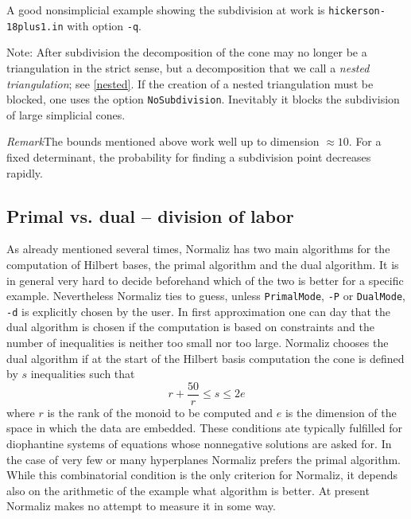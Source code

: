 \documentclass[12pt,a4paper]{scrartcl}
\theoremstyle{definition}
\begin{document}
{	A good nonsimplicial example showing the subdivision at work is \verb|hickerson-18plus1.in| with option \verb|-q|.
	
	Note: After subdivision the decomposition of the cone may no longer be a triangulation in the strict sense, but a decomposition that we call a \emph{nested triangulation}; see \ref{nested}. If the creation of a nested triangulation must be blocked, one uses the option \verb|NoSubdivision|. Inevitably it blocks the subdivision of large simplicial cones.
	
	\emph{Remark}\enspace The bounds mentioned above work well up to dimension $\approx 10$. For a fixed determinant, the probability for finding a subdivision point decreases rapidly.
	
	\subsection{Primal vs. dual -- division of labor}\label{div_labor}
	
	
	As already mentioned several times, Normaliz has two main algorithms for the computation of Hilbert bases, the primal algorithm and the dual algorithm. It is in general very hard to decide beforehand which of the two is better for a specific example. Nevertheless Normaliz ties to guess, unless \verb|PrimalMode|, \verb|-P| or \verb|DualMode|, \verb|-d| is explicitly chosen by the user. In first approximation one can day that the dual algorithm is chosen if the computation is based on constraints and the number of inequalities is neither too small nor too large. Normaliz chooses the dual algorithm if at the start of the Hilbert basis computation the cone is defined by $s$ inequalities such that
	$$
	r+\frac{50}{r} \le s \le 2e
	$$
	where $r$ is the rank of the monoid to be computed and $e$ is the dimension of the space in which the data are embedded. These conditions ate typically fulfilled for diophantine systems of equations whose nonnegative solutions are asked for. 
	In the case of very few or many hyperplanes Normaliz prefers the primal algorithm. While this combinatorial condition is the only criterion for Normaliz, it depends also on the arithmetic of the example what algorithm is better. At present Normaliz makes no attempt to measure it in some way.
	
}
\end{document}

